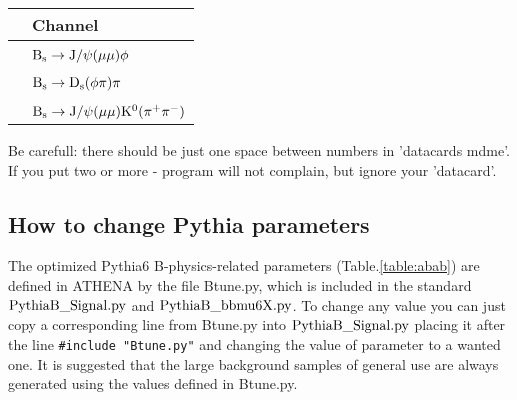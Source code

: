 \begin{tabular}{|p{75mm}|p{90mm}|}
\hline  & Channel\\ \hline
  & \\
\verb!#include "CloseAntibQuark.py";
      PythiaB.PythiaCommand+=[
                                    "pydat3 mdme 1120 1 1",
                                    "pydat3mdme 996 1 0",
                                    "pydat3 mdme 998 1 0" ]! &
    $ \rm B_{s} \rightarrow J/\psi(\mu\mu) \phi $                                 \\

 & \\ \hline
\verb!#include "CloseAntibQuark.py";
      #include"Dsphipi.py";
      PythiaB.PythiaCommand += [
                "pydat3 mdme 1105 1 1"]! &
 $ \rm B_{s} \rightarrow D_{s} (\phi \pi) \pi$     \\ \hline

& \\
 \verb!#include "CloseAntibQuark.py";
 PythiaB.PythiaCommand+= [
                                      "pydat3 mdme 1027 1 1",
                                      "pydat3 mdme 996 1 0",
                                      "pydat3 mdme 998 1 0" ]! &
$ \rm B_{s} \rightarrow J/\psi(\mu\mu) K^0(\pi^{+}\pi^{-}) $                                      \\
                                      \hline

\end{tabular}



Be carefull: there should be just one space between numbers in
'datacards mdme'. If you put two or more - program will not
complain, but ignore your 'datacard'.

\subsection{ How to change Pythia parameters}

 The optimized Pythia6 B-physics-related parameters (Table.\ref{table:abab})
  are defined in ATHENA by the file Btune.py, 
 which is  included in the standard $\rm PythiaB\_Signal.py$ and  
 $\rm PythiaB\_bbmu6X.py$. To change any value you can just copy a 
 corresponding line from  Btune.py into $\rm PythiaB\_Signal.py$ 
 placing it after the line \verb!#include "Btune.py"! and changing the value
 of parameter to a wanted one. It is suggested that the large background samples 
 of general use are always generated using the values defined in Btune.py.

